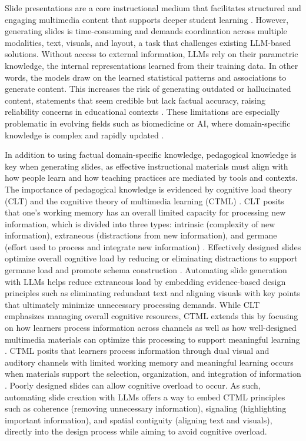 \documentclass[letterpaper]{article} %
\begin{document}
Slide presentations are a core instructional medium that facilitates structured and engaging multimedia content that supports deeper student learning \citep{alley2005rethinking, bartsch2003effectiveness, mayer2005introduction}. However, generating slides is time-consuming and demands coordination across multiple modalities, text, visuals, and layout, a task that challenges existing LLM-based solutions. Without access to external information, LLMs rely on their parametric knowledge, the internal representations learned from their training data. In other words, the models draw on the learned statistical patterns and associations to generate content. This increases the risk of generating outdated or hallucinated content, statements that seem credible but lack factual accuracy, raising reliability concerns in educational contexts \citep{flier2023publishing,cremin2022big, bender2021dangers}. 
These limitations are especially problematic in evolving fields such as biomedicine or AI, where domain-specific knowledge is complex and rapidly updated \citep{ahmad2023creating}. 



In addition to using factual domain-specific knowledge, pedagogical knowledge is key when generating slides, as effective instructional materials must align with how people learn and how teaching practices are mediated by tools and contexts. The importance of pedagogical knowledge is evidenced by cognitive load theory (CLT) and the cognitive theory of multimedia learning (CTML) \citep{chandler1991cognitive, mayer2005cognitive}. CLT posits that one’s working memory has an overall limited capacity for processing new information, which is divided into three types: intrinsic (complexity of new information), extraneous (distractions from new information), and germane (effort used to process and integrate new information) \citep{chandler1991cognitive}. Effectively designed slides optimize overall cognitive load by reducing or eliminating distractions to support germane load and promote schema construction \citep{paas20142}. Automating slide generation with LLMs helps reduce extraneous load by embedding evidence-based design principles such as eliminating redundant text and aligning visuals with key points that ultimately minimize unnecessary processing demands. While CLT emphasizes managing overall cognitive resources, CTML extends this by focusing on how learners process information across channels as well as how well-designed multimedia materials can optimize this processing to support meaningful learning \citep{mayer2002multimedia, mayer2005introduction}. CTML posits that learners process information through dual visual and auditory channels with limited working memory and meaningful learning occurs when materials support the selection, organization, and integration of information \citep{mayer2002multimedia,mayer2005introduction}. Poorly designed slides can allow cognitive overload to occur. As such, automating slide creation with LLMs offers a way to embed CTML principles such as coherence (removing unnecessary information), signaling (highlighting important information), and spatial contiguity (aligning text and visuals), directly into the design process while aiming to avoid cognitive overload.
\end{document}
